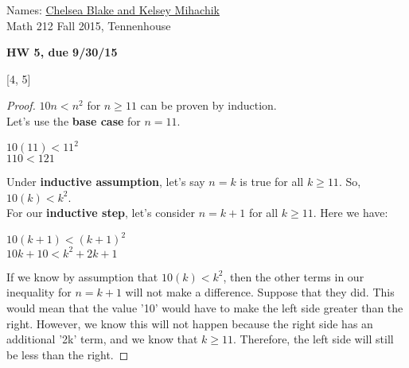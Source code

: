 \documentclass[12pt,letterpaper]{exam}
\begin{document}
\setlength{\pdfpageheight}{\paperheight}
\setlength{\pdfpagewidth}{\paperwidth}

\newcommand{\ud}{\,\mathrm{d}}
\pointsinmargin

Names: \underline{Chelsea Blake and Kelsey Mihachik}\\
Math 212 Fall 2015, Tennenhouse \\


\begin{center}
\textbf{HW 5, due 9/30/15}\\
\end{center}




[4, 5]
\begin{proof}$10n<n^2$ for $n\geq 11$ can be proven by induction.\\
Let's use the \textbf{base case} for $n=11$.
\begin{center}$10(11)<11^2$\\
$110<121$\end{center}
Under \textbf{inductive assumption}, let's say $n=k$ is true for all $k\geq 11$. So, $10(k)<k^2$.\\
For our \textbf{inductive step}, let's consider $n=k+1$ for all $k\geq 11$. Here we have:
\begin{center}$10(k+1)<(k+1)^2$\\
$10k + 10 < k^2+2k+1$\end{center}
If we know by assumption that $10(k)<k^2$, then the other terms in our inequality for $n=k+1$ will not make a difference. Suppose that they did. This would mean that the value '10' would have to make the left side greater than the right. However, we know this will not happen because the right side has an additional '2k' term, and we know that $k \geq 11$. Therefore, the left side will still be less than the right.
\end{proof}
\end{document}
